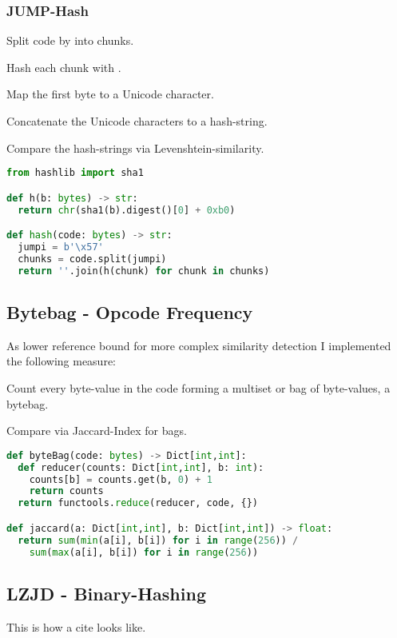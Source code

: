 \documentclass[../main.tex]{subfiles}
\begin{document}
\subsubsection{JUMP-Hash}
\begin{ol}
  \item Split code by  into chunks.
  \item Hash each chunk with .
  \item Map the first byte to a Unicode character.
  \item Concatenate the Unicode characters to a hash-string.
  \item Compare the hash-strings via Levenshtein-similarity.
\end{ol}
\begin{lstlisting}[basicstyle=\ttfamily,language=Python]
from hashlib import sha1

def h(b: bytes) -> str:
  return chr(sha1(b).digest()[0] + 0xb0)

def hash(code: bytes) -> str:
  jumpi = b'\x57'
  chunks = code.split(jumpi)
  return ''.join(h(chunk) for chunk in chunks)
\end{lstlisting}

\subsection{Bytebag - Opcode Frequency}
As lower reference bound for more complex similarity detection I implemented the following measure:

\begin{ol}
  \item Count every byte-value in the code forming a multiset or bag of byte-values, a bytebag.
  \item Compare via Jaccard-Index for bags.
\end{ol}

\begin{lstlisting}[basicstyle=\ttfamily,language=Python]
def byteBag(code: bytes) -> Dict[int,int]:
  def reducer(counts: Dict[int,int], b: int):
    counts[b] = counts.get(b, 0) + 1
    return counts
  return functools.reduce(reducer, code, {})

def jaccard(a: Dict[int,int], b: Dict[int,int]) -> float:
  return sum(min(a[i], b[i]) for i in range(256)) /
    sum(max(a[i], b[i]) for i in range(256))
\end{lstlisting}

\subsection{LZJD - Binary-Hashing}
This is how a cite\cite{sung2004static} looks like.
\end{document}
